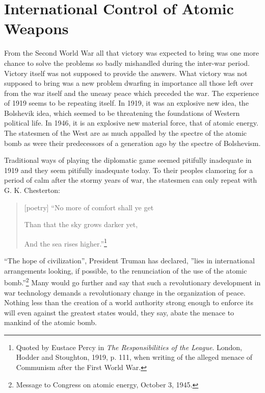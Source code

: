
\chapter[International Control of Atomic Weapons]{International Control of Atomic Weapons}

\vspace{-2pt}


\vspace{39pt}

From the Second World War all that victory was expected to bring was one more chance to solve the problems so badly mishandled during the inter-war period. Victory itself was not supposed to provide the answers. What victory was not supposed to bring was a new problem dwarfing in importance all those left over from the war itself and the uneasy peace which preceded the war. The experience of 1919 seems to be repeating itself. In 1919, it was an explosive new idea, the Bolshevik idea, which seemed to be threatening the foundations of Western political life. In 1946, it is an explosive new material force, that of atomic energy. The statesmen of the West are as much appalled by the spectre of the atomic bomb as were their predecessors of a generation ago by the spectre of Bolshevism.

Traditional ways of playing the diplomatic game seemed pitifully inadequate in 1919 and they seem pitifully inadequate today. To their peoples clamoring for a period of calm after the stormy years of war, the statesmen can only repeat with G. K. Chesterton:

\begin{quote}[poetry]
``No more of comfort shall ye get

Than that the sky grows darker yet,

And the sea rises higher.''\footnote{Quoted by Eustace Percy in \textit{The Responsibilities of the League}. London, Hodder and Stoughton, 1919, p. 111, when writing of the alleged menace of Communism after the First World War.}
\end{quote}

``The hope of civilization'', President Truman has declared, ''lies in international arrangements looking, if possible, to the renunciation of the use of the atomic bomb.''\footnote{Message to Congress on atomic energy, October 3, 1945.} Many would go further and say that such a revolutionary development in war technology demands a revolutionary change in the organization of peace. Nothing less than the creation of a world authority strong enough to enforce its will even against the greatest states would, they say, abate the menace to mankind of the atomic bomb.

